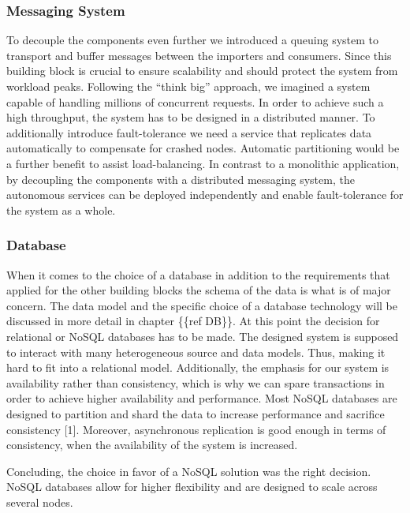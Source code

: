 \subsubsection{Messaging System}\label{messaging-system}

To decouple the components even further we introduced a queuing system
to transport and buffer messages between the importers and consumers.
Since this building block is crucial to ensure scalability and should
protect the system from workload peaks. Following the ``think big''
approach, we imagined a system capable of handling millions of
concurrent requests. In order to achieve such a high throughput, the
system has to be designed in a distributed manner. To additionally
introduce fault-tolerance we need a service that replicates data
automatically to compensate for crashed nodes. Automatic partitioning
would be a further benefit to assist load-balancing. In contrast to a
monolithic application, by decoupling the components with a distributed
messaging system, the autonomous services can be deployed independently
and enable fault-tolerance for the system as a whole.

\subsubsection{Database}\label{database}

When it comes to the choice of a database in addition to the
requirements that applied for the other building blocks the schema of
the data is what is of major concern. The data model and the specific
choice of a database technology will be discussed in more detail in
chapter \{\{ref DB\}\}. At this point the decision for relational or
NoSQL databases has to be made. The designed system is supposed to
interact with many heterogeneous source and data models. Thus, making it
hard to fit into a relational model. Additionally, the emphasis for our
system is availability rather than consistency, which is why we can
spare transactions in order to achieve higher availability and
performance. Most NoSQL databases are designed to partition and shard
the data to increase performance and sacrifice consistency {[}1{]}.
Moreover, asynchronous replication is good enough in terms of
consistency, when the availability of the system is increased.

Concluding, the choice in favor of a NoSQL solution was the right
decision. NoSQL databases allow for higher flexibility and are designed
to scale across several nodes.

